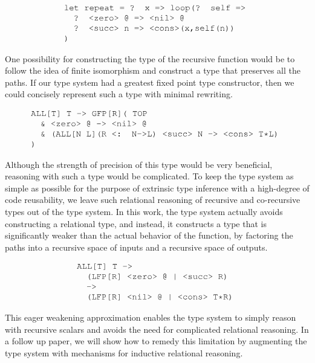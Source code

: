 \documentclass[acmsmall]{acmart}
\theoremstyle{definition}
\begin{document}
\[
  \begin{array}[t]{@{} l}
      \J{let repeat = ? x => loop(? self =>}
      \\
      \I \J{? <zero> @ => <nil> @}
      \\
      \I \J{? <succ> n => <cons>(x,self(n))}
      \\
      \J{)}
  \end{array}
\]

\noindent
One possibility for constructing the type of the recursive function would
be to follow the idea of finite isomorphism and construct a type 
that preserves all the paths. If our type system had a greatest fixed point
type constructor, then we could concisely represent such a type with minimal
rewriting.

\[
  \begin{array}[t]{@{} l}
      \J{ALL[T] T -> GFP[R]( TOP} 
      \\
      \I \J{\& <zero> @ -> <nil> @}
      \\
      \I \J{\& (ALL[N L](R <: N->L) <succ> N -> <cons> T*L)}
      \\
      \J{)} 
  \end{array}
\]

\noindent
Although the strength of precision of this type would be very beneficial,
reasoning with such a type would be complicated. To keep the type system as
simple as possible for the purpose of extrinsic type inference with a high-degree
of code reusability, we leave such relational reasoning of recursive and co-recursive types out of
the type system. 
In this work, the type system actually avoids constructing a relational type, and instead, it
constructs a type that is significantly weaker than the actual behavior of the function,
by factoring the paths into a recursive space of inputs and a recursive space of outputs. 

\[
  \begin{array}[t]{@{} l}
      \J{ALL[T] T ->} 
      \\
      \I \J{(LFP[R] <zero> @ | <succ> R)}
      \\
      \I \J{->}
      \\
      \I \J{(LFP[R] <nil> @ | <cons> T*R)}
  \end{array}
\]

\noindent
This eager weakening approximation enables the type system
to simply reason with recursive scalars and avoids the need for complicated
relational reasoning. In a follow up paper,
we will show how to remedy this limitation by augmenting the type system with
mechanisms for inductive relational reasoning.
\end{document}
